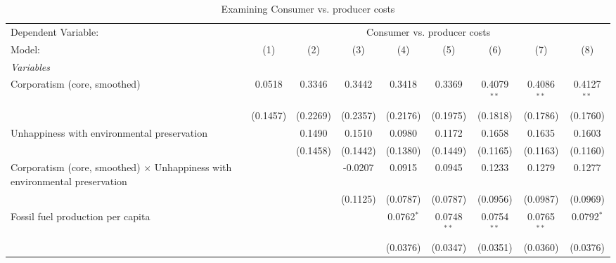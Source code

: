 
\begin{table}[htbp]
   \caption{Examining Consumer vs. producer costs}
   \centering
   \begin{tabular}{lcccccccc}
      \tabularnewline \midrule \midrule
      Dependent Variable: & \multicolumn{8}{c}{Consumer vs. producer costs}\\
      Model:                                                                             & (1)      & (2)      & (3)      & (4)          & (5)           & (6)           & (7)           & (8)\\  
      \midrule
      \emph{Variables}\\
      Corporatism (core, smoothed)                                                       & 0.0518   & 0.3346   & 0.3442   & 0.3418       & 0.3369        & 0.4079$^{**}$ & 0.4086$^{**}$ & 0.4127$^{**}$\\   
                                                                                         & (0.1457) & (0.2269) & (0.2357) & (0.2176)     & (0.1975)      & (0.1818)      & (0.1786)      & (0.1760)\\   
      Unhappiness with environmental preservation                                        &          & 0.1490   & 0.1510   & 0.0980       & 0.1172        & 0.1658        & 0.1635        & 0.1603\\   
                                                                                         &          & (0.1458) & (0.1442) & (0.1380)     & (0.1449)      & (0.1165)      & (0.1163)      & (0.1160)\\   
      Corporatism (core, smoothed) $\times$ Unhappiness with environmental preservation  &          &          & -0.0207  & 0.0915       & 0.0945        & 0.1233        & 0.1279        & 0.1277\\   
                                                                                         &          &          & (0.1125) & (0.0787)     & (0.0787)      & (0.0956)      & (0.0987)      & (0.0969)\\   
      Fossil fuel production per capita                                                  &          &          &          & 0.0762$^{*}$ & 0.0748$^{**}$ & 0.0754$^{**}$ & 0.0765$^{**}$ & 0.0792$^{*}$\\   
                                                                                         &          &          &          & (0.0376)     & (0.0347)      & (0.0351)      & (0.0360)      & (0.0376)\\   

\end{tabular}
\end{table}
